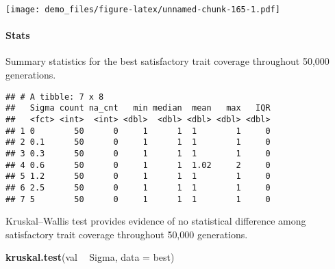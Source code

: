 \documentclass[]{book}
\newenvironment{Shaded}{\begin{snugshade}}{\end{snugshade}}
\newcommand{\DataTypeTok}[1]{\textcolor[rgb]{0.13,0.29,0.53}{#1}}
\newcommand{\KeywordTok}[1]{\textcolor[rgb]{0.13,0.29,0.53}{\textbf{#1}}}
\newcommand{\NormalTok}[1]{#1}
\newcommand{\OperatorTok}[1]{\textcolor[rgb]{0.81,0.36,0.00}{\textbf{#1}}}
\newcommand{\OtherTok}[1]{\textcolor[rgb]{0.56,0.35,0.01}{#1}}
\newcommand{\StringTok}[1]{\textcolor[rgb]{0.31,0.60,0.02}{#1}}
\let\oldparagraph\paragraph
\renewcommand{\paragraph}[1]{\oldparagraph{#1}\mbox{}}
\begin{document}
\texttt{[image: demo\_files/figure-latex/unnamed-chunk-165-1.pdf]}

\hypertarget{stats-31}{%
\paragraph{Stats}\label{stats-31}}

Summary statistics for the best satisfactory trait coverage throughout 50,000 generations.

\begin{Shaded}
\end{Shaded}

\begin{verbatim}
## # A tibble: 7 x 8
##   Sigma count na_cnt   min median  mean   max   IQR
##   <fct> <int>  <int> <dbl>  <dbl> <dbl> <dbl> <dbl>
## 1 0        50      0     1      1  1        1     0
## 2 0.1      50      0     1      1  1        1     0
## 3 0.3      50      0     1      1  1        1     0
## 4 0.6      50      0     1      1  1.02     2     0
## 5 1.2      50      0     1      1  1        1     0
## 6 2.5      50      0     1      1  1        1     0
## 7 5        50      0     1      1  1        1     0
\end{verbatim}

Kruskal--Wallis test provides evidence of no statistical difference among satisfactory trait coverage throughout 50,000 generations.

\begin{Shaded}
\begin{Highlighting}[]
\KeywordTok{kruskal.test}\NormalTok{(val }\OperatorTok{~}\StringTok{ }\NormalTok{Sigma, }\DataTypeTok{data =}\NormalTok{ best)}
\end{Highlighting}
\end{Shaded}
\end{document}
